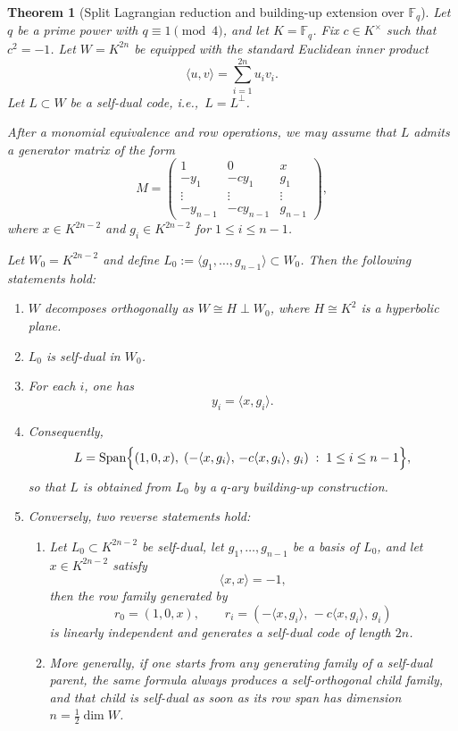 \documentclass[12pt]{article}
\newtheorem{theorem}{Theorem}[section]
\newenvironment{blueblock}{\begingroup\color{blue}}{\endgroup}
\begin{document}
\begin{theorem}[Split Lagrangian reduction and building-up extension over $\mathbb{F}_q$]\label{thm:qary-building-up}
Let $q$ be a prime power with $q \equiv 1 \pmod{4}$, and let $K=\mathbb{F}_q$.
Fix $c \in K^\times$ such that $c^2=-1$.
Let $W=K^{2n}$ be equipped with the standard Euclidean inner product
\[
\langle u,v\rangle = \sum_{i=1}^{2n} u_i v_i.
\]
Let $L \subset W$ be a self-dual code, i.e.,\ $L=L^\perp$.

After a monomial equivalence and row operations, we may assume that $L$ admits a generator matrix of the form
\[
M=
\begin{pmatrix}
1 & 0 & x\\
-y_1 & -c y_1 & g_1\\
\vdots & \vdots & \vdots\\
-y_{n-1} & -c y_{n-1} & g_{n-1}
\end{pmatrix},
\]
where $x \in K^{2n-2}$ and $g_i \in K^{2n-2}$ for $1 \le i \le n-1$.

Let $W_0 = K^{2n-2}$ and define $L_0 := \langle g_1,\dots,g_{n-1}\rangle \subset W_0$.
Then the following statements hold:
\begin{enumerate}
\item $W$ decomposes orthogonally as $W \cong H \perp W_0$, where $H \cong K^2$ is a hyperbolic plane.
\item $L_0$ is self-dual in $W_0$.
\item For each $i$, one has
\[
y_i = \langle x, g_i\rangle.
\]
\item Consequently,
\[
L = \operatorname{Span}\Bigl\{(1,0,x),\;
(-\langle x,g_i\rangle,\,-c\langle x,g_i\rangle,\,g_i)\;:\;1 \le i \le n-1\Bigr\},
\]
so that $L$ is obtained from $L_0$ by a $q$-ary building-up construction.
\item Conversely, two reverse statements hold:
\begin{enumerate}[label=(5\alph*)]
\item Let $L_0 \subset K^{2n-2}$ be self-dual, let $g_1,\dots,g_{n-1}$ be a basis of $L_0$, and let $x \in K^{2n-2}$ satisfy
\[
\langle x,x\rangle = -1,
\]
then the row family generated by
\[
r_0 = (1,0,x), \qquad
r_i = (-\langle x,g_i\rangle,\,-c\langle x,g_i\rangle,\,g_i)
\]
is linearly independent and generates a self-dual code of length $2n$.
\item More generally, if one starts from any generating family of a self-dual parent, the same formula always produces a self-orthogonal child family, and that child is self-dual as soon as its row span has dimension $n=\frac12 \dim W$.
\end{enumerate}
\end{enumerate}
\end{theorem}
\end{document}
